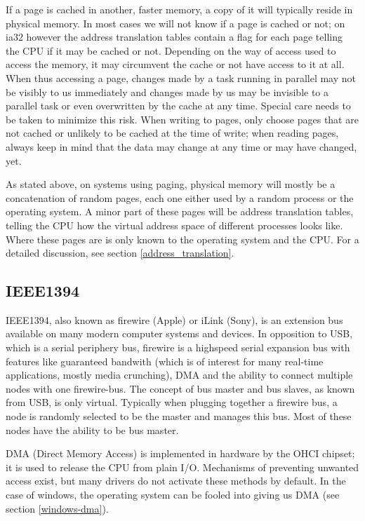 If a page is cached in another, faster memory, a copy of it will typically
reside in physical memory. In most cases we will not know if a page is cached
or not; on ia32 however the address translation tables contain a flag for each
page telling the CPU if it may be cached or not. Depending on the way of access
used to access the memory, it may circumvent the cache or not have access to it
at all. When thus accessing a page, changes made by a task running in parallel
may not be visibly to us immediately and changes made by us may be invisible to
a parallel task or even overwritten by the cache at any time. Special care
needs to be taken to minimize this risk. When writing to pages, only choose
pages that are not cached or unlikely to be cached at the time of write; when
reading pages, always keep in mind that the data may change at any time or may
have changed, yet.

As stated above, on systems using paging, physical memory will mostly be a
concatenation of random pages, each one either used by a random process or the
operating system. A minor part of these pages will be address translation
tables, telling the CPU how the virtual address space of different processes
looks like. Where these pages are is only known to the operating system and the
CPU. For a detailed discussion, see section \ref{address_translation}.



\subsection{IEEE1394}

IEEE1394, also known as firewire (Apple) or iLink (Sony), is an extension bus
available on many modern computer systems and devices.  In opposition to USB,
which is a serial periphery bus, firewire is a highspeed serial expansion bus
with features like guaranteed bandwith (which is of interest for many real-time
applications, mostly media crunching), DMA and the ability to connect multiple
nodes with one firewire-bus. The concept of bus master and bus slaves, as known
from USB, is only virtual. Typically when plugging together a firewire bus, a
node is randomly selected to be the master and manages this bus. Most of these
nodes have the ability to be bus master.

DMA (Direct Memory Access) is implemented in hardware by the OHCI chipset; it
is used to release the CPU from plain I/O. Mechanisms of preventing unwanted
access exist, but many drivers do not activate these methods by default. In the
case of windows, the operating system can be fooled into giving us DMA (see
section \ref{windows-dma}).

